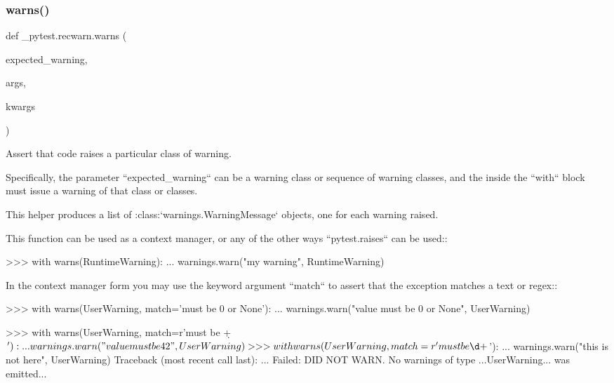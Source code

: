 \subsubsection{\texorpdfstring{warns()}{warns()}}
{\footnotesize\ttfamily def \+\_\+pytest.\+recwarn.\+warns (\begin{DoxyParamCaption}\item[{}]{expected\+\_\+warning,  }\item[{}]{args,  }\item[{}]{kwargs }\end{DoxyParamCaption})}

\begin{DoxyVerb}Assert that code raises a particular class of warning.

Specifically, the parameter ``expected_warning`` can be a warning class or
sequence of warning classes, and the inside the ``with`` block must issue a warning of that class or
classes.

This helper produces a list of :class:`warnings.WarningMessage` objects,
one for each warning raised.

This function can be used as a context manager, or any of the other ways
``pytest.raises`` can be used::

    >>> with warns(RuntimeWarning):
    ...    warnings.warn("my warning", RuntimeWarning)

In the context manager form you may use the keyword argument ``match`` to assert
that the exception matches a text or regex::

    >>> with warns(UserWarning, match='must be 0 or None'):
    ...     warnings.warn("value must be 0 or None", UserWarning)

    >>> with warns(UserWarning, match=r'must be \d+$'):
    ...     warnings.warn("value must be 42", UserWarning)

    >>> with warns(UserWarning, match=r'must be \d+$'):
    ...     warnings.warn("this is not here", UserWarning)
    Traceback (most recent call last):
      ...
    Failed: DID NOT WARN. No warnings of type ...UserWarning... was emitted...\end{DoxyVerb}
 